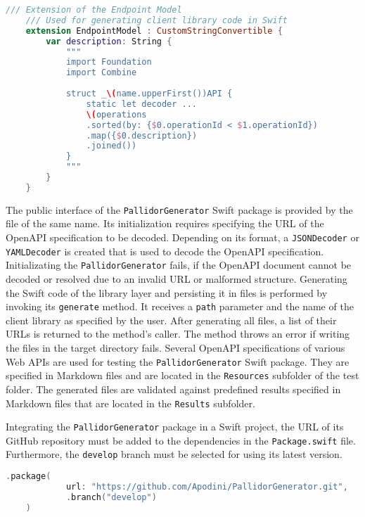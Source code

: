\begin{lstlisting}[language=Swift, caption={Source code string template for an endpoint}, captionpos=b, label={lst:EndpointTempl}]
	/// Extension of the Endpoint Model
	/// Used for generating client library code in Swift
	extension EndpointModel : CustomStringConvertible {
		var description: String {
			"""
			import Foundation
			import Combine
			
			struct _\(name.upperFirst())API {
				static let decoder ...
				\(operations
				.sorted(by: {$0.operationId < $1.operationId})
				.map({$0.description})
				.joined())
			}
			"""
		}
	}

\end{lstlisting}

The public interface of the \texttt{PallidorGenerator} Swift package is provided by the file of the same name. Its initialization requires specifying the URL of the OpenAPI specification to be decoded. Depending on its format, a \texttt{JSON\-Decoder} or \texttt{YAML\-Decoder} is created that is used to decode the OpenAPI specification. Initializating the \texttt{Pal\-li\-dor\-Gen\-er\-ator} fails, if the OpenAPI document cannot be decoded or resolved due to an invalid URL or malformed structure. Generating the Swift code of the library layer and persisting it in files is performed by invoking its \texttt{generate} method. It receives a \texttt{path} parameter and the name of the client library as specified by the user. After generating all files, a list of their URLs is returned to the method's caller. The method throws an error if writing the files in the target directory fails. Several OpenAPI specifications of various Web APIs are used for testing the \texttt{PallidorGenerator} Swift package. They are specified in Markdown files and are located in the \texttt{Resources} subfolder of the test folder. The generated files are validated against predefined results specified in Markdown files that are located in the \texttt{Results} subfolder. 

Integrating the \texttt{PallidorGenerator} package in a Swift project, the URL of its GitHub repository must be added to the dependencies in the \texttt{Package.swift} file. Furthermore, the \texttt{develop} branch must be selected for using its latest version.
\newpage
\begin{lstlisting}[language=Swift, caption={Integrating PallidorGenerator in SPM}, captionpos=b, label={lst:IntegrationGenerator}]
	.package(
			url: "https://github.com/Apodini/PallidorGenerator.git", 
			.branch("develop")
	)
\end{lstlisting}



